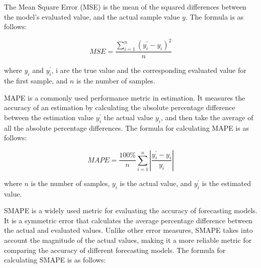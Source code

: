 \documentclass[acmsmall, screen]{acmart}
\begin{document}
The Mean Square Error (MSE) is the mean of the squared differences between the model's evaluated value, and the actual sample value \begin{math}
  y
\end{math}. The formula is as follows:

\begin{equation}
  MSE=\frac{\sum_{i=1}^{n}\left(y_i^\prime-y_i\right)^2}{n} \label{mse}
\end{equation}

where \begin{math}
  y_i
\end{math} and \begin{math}
  y_i^\prime
\end{math}, i are the true value and the corresponding evaluated value for the first sample, and \begin{math}
  n
\end{math} is the number of samples.

MAPE is a commonly used performance metric in estimation. It measures the accuracy of an estimation by calculating the absolute percentage difference between the estimation value \begin{math}
  y_i^\prime
\end{math} the actual value \begin{math}
  y_i
\end{math}, and then take the average of all the absolute percentage differences. The formula for calculating MAPE is as follows:

\begin{equation}
  MAPE=\frac{100\%}{n}\sum_{i=1}^{n}\left|\frac{y_i^\prime-y_i}{y_i}\right| \label{mape}
\end{equation}

where \begin{math}
  n
\end{math} is the number of samples, \begin{math}
  y_i
\end{math} is the actual value, and \begin{math}
  y_i^\prime
\end{math} is the estimated value.

SMAPE is a widely used metric for evaluating the accuracy of forecasting models. It is a symmetric error that calculates the average percentage difference between the actual and evaluated values. Unlike other error measures, SMAPE takes into account the magnitude of the actual values, making it a more reliable metric for comparing the accuracy of different forecasting models. The formula for calculating SMAPE is as follows:
\end{document}
